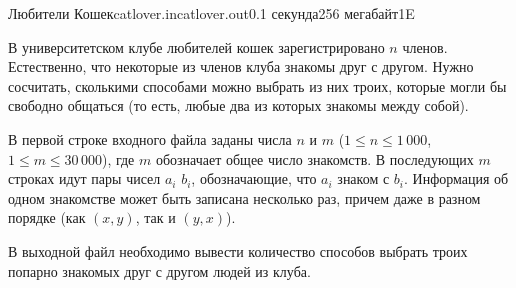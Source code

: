 \begin{problem}{Любители Кошек}{catlover.in}{catlover.out}{0.1 секунда}{256 мегабайт}{1E}

В университетском клубе любителей кошек зарегистрировано $n$ членов.
Естественно, что некоторые из членов клуба знакомы друг с другом.
Нужно сосчитать, сколькими способами можно выбрать из них троих, которые могли бы
свободно общаться (то есть, любые два из которых знакомы между собой).

\InputFile

В первой строке входного файла заданы числа $n$ и $m$ ($1\le n\le 1\,000$, $1\le m\le 30\,000$),
где $m$ обозначает общее число знакомств. В последующих $m$ строках идут пары чисел
$a_i$ $b_i$, обозначающие, что $a_i$ знаком с $b_i$. Информация
об одном знакомстве может быть записана несколько раз, причем
даже в разном порядке (как $(x, y)$, так и $(y, x)$).

\OutputFile

В выходной файл необходимо вывести количество способов выбрать троих попарно знакомых
друг с другом людей из клуба.

\Example

\begin{example}
%
\end{example}

\end{problem}
